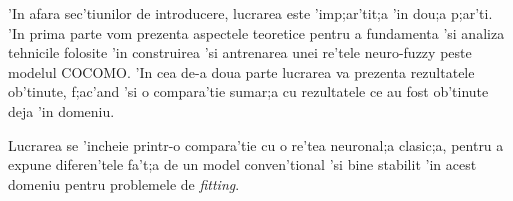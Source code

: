 \par
'In afara sec'tiunilor de introducere, lucrarea este 'imp;ar'tit;a 'in dou;a p;ar'ti. 'In prima parte vom prezenta aspectele teoretice pentru a fundamenta 'si analiza tehnicile folosite 'in construirea 'si antrenarea unei re'tele neuro-fuzzy peste modelul COCOMO. 'In cea de-a doua parte lucrarea va prezenta rezultatele ob'tinute, f;ac'and 'si o compara'tie sumar;a cu rezultatele ce au fost ob'tinute deja 'in domeniu.

\par
Lucrarea se 'incheie printr-o compara'tie cu o re'tea neuronal;a clasic;a, pentru a expune diferen'tele fa't;a de un model conven'tional 'si bine stabilit 'in acest domeniu pentru problemele de \textit{fitting}.

\par